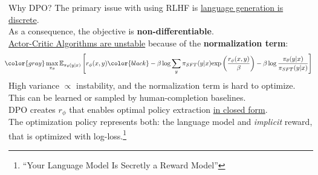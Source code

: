 \documentclass{beamer}
\begin{document}
\bgroup
\let\oldfootnoterule\footnoterule
\def\footnoterule{\only<6->\oldfootnoterule}
\begin{frame}{Why DPO?}
	The primary issue with using RLHF is \underline{language generation is discrete}. \pause \\

	As a consequence, the objective is \textbf{non-differentiable}. \pause \newline \\

	\underline{Actor-Critic Algorithms are unstable} because of the \textbf{normalization term}:
	\begin{gather}
		\hspace{-0.7em}
		\color{gray} \max_{\pi_\theta} \mathbb{E}_{\pi_\theta(y|x)} \left[r_\phi(x,y) {\color{black} -\beta \log\sum_y\pi_{SFT}(y|x)\text{exp}\left(\frac{r_\phi(x,y)}{\beta}\right)} - \beta \log \frac{\pi_\theta(y|x)}{\pi_{SFT}(y|x)} \right]
	\end{gather}
	High variance $\propto$ instability, and the normalization term is hard to optimize. \pause This can be learned or sampled by human-completion baselines. \pause \newline \\

	\vspace{-0.4em}
	DPO creates $r_\phi$ that enables optimal policy extraction \underline{in closed form}. \pause \newline \\

	\vspace{-0.4em}
	The optimization policy represents both: the language model and \textit{implicit} reward, that is optimized with log-loss.\footnote<6->{``Your Language Model Is Secretly a Reward Model''}
\end{frame}
\egroup
\end{document}
